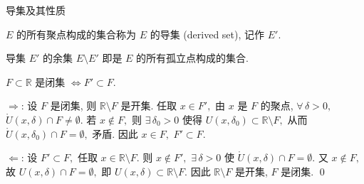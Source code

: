 \begin{frame}{导集及其性质}

\begin{Def}[导集]
$E$ 的所有聚点构成的集合称为 $E$ 的\alert{导集} (derived set), 记作 $E'.$
\end{Def}

\pause
\vspace{0.5em}

\begin{remark}
导集 $E'$ 的余集 $E \setminus E'$ 即是 $E$ 的所有孤立点构成的集合.
\end{remark}

\pause
\vspace{0.5em}

\begin{thm}[导集给出的闭集刻画]
$F \subset \mathbb{R}$ 是闭集 $\iff F' \subset F.$
\end{thm}

\pause
\vspace{0.5em}

\startproof[bg=yellow, fg=red]
\vspace{0.5em}

$\Longrightarrow$: 设 $F$ 是闭集, 则 $\mathbb{R} \setminus F$ 是开集. 任取 $x \in F',$ 由 $x$ 是 $F$ 的聚点, $\forall\, \delta > 0,$ $\mathring{U}(x, \delta) \cap F \neq \emptyset.$ 若 $x \notin F,$ 则 $\exists\, \delta_0 > 0$ 使得 $U(x, \delta_0) \subset \mathbb{R} \setminus F,$ 从而 $\mathring{U}(x, \delta_0) \cap F = \emptyset,$ 矛盾. 因此 $x \in F,$ $F' \subset F.$

\pause
\vspace{0.5em}

$\Longleftarrow$: 设 $F' \subset F,$ 任取 $x \in \mathbb{R} \setminus F.$ 则 $x \notin F',$ $\exists\, \delta > 0$ 使 $\mathring{U}(x, \delta) \cap F = \emptyset.$ 又 $x \notin F,$ 故 $U(x, \delta) \cap F = \emptyset,$ 即 $U(x, \delta) \subset \mathbb{R} \setminus F.$ 因此 $\mathbb{R} \setminus F$ 是开集, $F$ 是闭集.
\qed

\end{frame}


